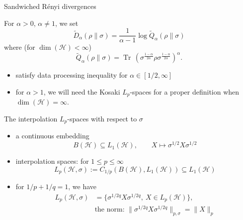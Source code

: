 \documentclass[mathserif]{beamer}
\newcommand{\<}{\langle}
\renewcommand{\>}{\rangle}
\newcommand{\supp}{\operatorname{supp}}
\newcommand{\Tr}{\operatorname{Tr}\,}
\newcommand{\Ha}{\mathcal H}
\begin{document}
\begin{frame}{Sandwiched R\'enyi divergences}


For $\alpha>0$, $\alpha\ne 1$, we set 
\[
\tilde D_\alpha(\rho\|\sigma)= \frac{1}{\alpha-1}\log \tilde Q_\alpha(\rho\|\sigma)
\]
where (for $\dim(\Ha)<\infty$)
\[
\tilde
Q_\alpha(\rho\|\sigma)=\Tr\left(\sigma^{\frac{1-\alpha}{2\alpha}}\rho\sigma^{\frac{1-\alpha}{2\alpha}}\right)^\alpha. 
\]


\begin{itemize}
\item satisfy data processing inequality for $\alpha\in [1/2,\infty]$
\item for  $\alpha>1$, we will need the Kosaki $L_p$-spaces for a proper definition  when
$\dim(\Ha)=\infty$.

\end{itemize}
%


\end{frame}





\begin{frame}{The interpolation  $L_p$-spaces with respect to $\sigma$}


\begin{itemize}
\item a continuous embedding 
\[
B(\Ha) \subseteq L_1(\Ha), \qquad X\mapsto \sigma^{1/2}X\sigma^{1/2}
\]
\item interpolation spaces: for $1\le p\le \infty$
\[
L_p(\Ha,\sigma):= C_{1/p}(B(\Ha), L_1(\Ha)) \subseteq L_1(\Ha)  
\]
\item for $1/p+1/q=1$, we have
\begin{align*}
L_p(\Ha,\sigma)&=\{\sigma^{1/2q}X\sigma^{1/2q},\ X\in L_p(\Ha)\},\\[7pt]
&\text{the norm: }  \|\sigma^{1/2q}X\sigma^{1/2q}\|_{p,\sigma}=\|X\|_p
\end{align*}


\end{itemize}


\end{frame}
\end{document}
